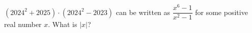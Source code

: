 $(2024^2 +2025)\cdot  (2024^2 -2023)$ can be written as $\dfrac{x^6-1}{x^2-1}$ for some positive real number $x$. What is $|x|$?
